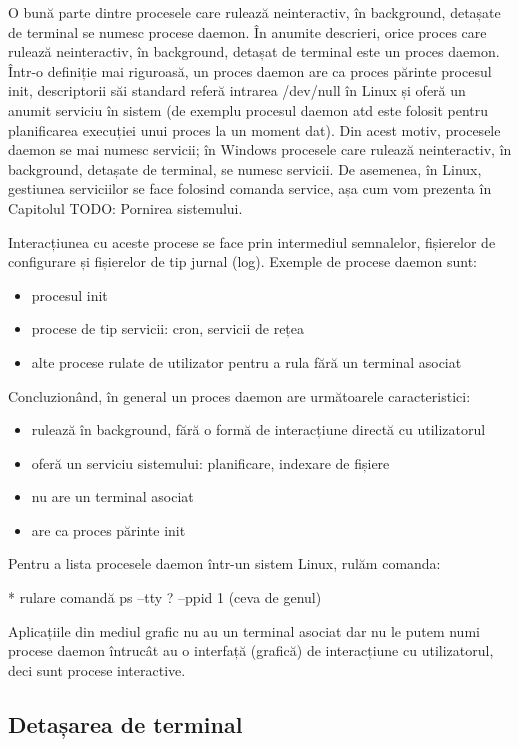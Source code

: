 O bună parte dintre procesele care rulează neinteractiv, în background, detașate
de terminal se numesc procese daemon. În anumite descrieri, orice proces care
rulează neinteractiv, în background, detașat de terminal este un proces daemon.
Într-o definiție mai riguroasă, un proces daemon are ca proces părinte procesul
init, descriptorii săi standard referă intrarea /dev/null în Linux și oferă un
anumit serviciu în sistem (de exemplu procesul daemon atd este folosit pentru
planificarea execuției unui proces la un moment dat). Din acest motiv, procesele
daemon se mai numesc servicii; în Windows procesele care rulează neinteractiv,
în background, detașate de terminal, se numesc servicii. De asemenea, în Linux,
gestiunea serviciilor se face folosind comanda service, așa cum vom prezenta în
Capitolul TODO: Pornirea sistemului.

Interacțiunea cu aceste procese se face prin intermediul semnalelor, fișierelor
de configurare și fișierelor de tip jurnal (log). Exemple de procese daemon
sunt:

\begin{itemize}
	\item procesul init
	\item procese de tip servicii: cron, servicii de rețea
	\item alte procese rulate de utilizator pentru a rula fără un terminal asociat
\end{itemize}

Concluzionând, în general un proces daemon are următoarele caracteristici:

\begin{itemize}
	\item rulează în background, fără o formă de interacțiune directă cu utilizatorul
	\item oferă un serviciu sistemului: planificare, indexare de fișiere
	\item nu are un terminal asociat
	\item are ca proces părinte init
\end{itemize}

Pentru a lista procesele daemon într-un sistem Linux, rulăm comanda:

* rulare comandă ps --tty ? --ppid 1 (ceva de genul)

Aplicațiile din mediul grafic nu au un terminal asociat dar nu le putem numi
procese daemon întrucât au o interfață (grafică) de interacțiune cu
utilizatorul, deci sunt procese interactive.

\subsection{Detașarea de terminal}
\label{sec:procese-interactivitate-detasare}

